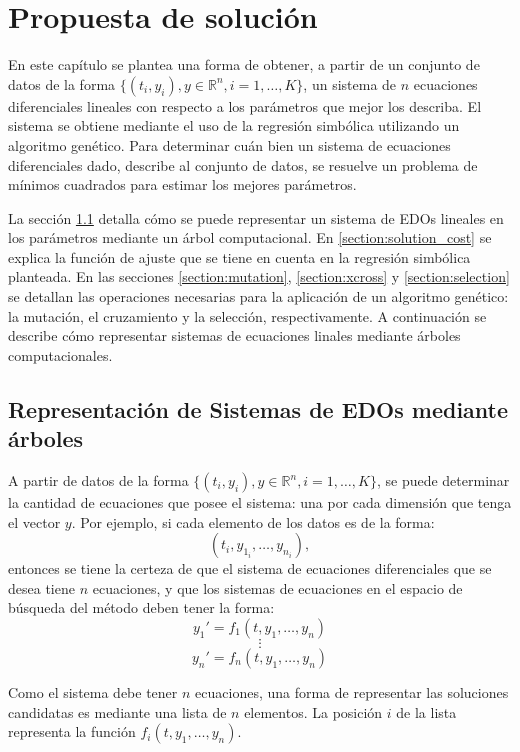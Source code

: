 \chapter{Propuesta de solución}\label{chapter:solution_proposal}

En este capítulo se plantea una forma de obtener, a partir de un conjunto de datos de la forma $\{(t_i, y_i), y \in \mathbb{R}^n, i = 1, \dots, K\}$, un sistema de $n$ ecuaciones diferenciales lineales con respecto a los parámetros que mejor los describa. El sistema se obtiene mediante el uso de la regresión simbólica utilizando un algoritmo genético. Para determinar cuán bien un sistema de ecuaciones diferenciales dado, describe al conjunto de datos, se resuelve un problema de mínimos cuadrados para estimar los mejores parámetros.

La sección \ref{section:solution_representation} detalla cómo se puede representar un sistema de EDOs lineales en los parámetros mediante un árbol computacional. En \ref{section:solution_cost} se explica la función de ajuste que se tiene en cuenta en la regresión simbólica planteada. En las secciones \ref{section:mutation}, \ref{section:xcross} y \ref{section:selection} se detallan las operaciones necesarias para la aplicación de un algoritmo genético: la mutación, el cruzamiento y la selección, respectivamente. A continuación se describe cómo representar sistemas de ecuaciones linales mediante árboles computacionales.


\section{Representación de Sistemas de EDOs mediante árboles}\label{section:solution_representation}

A partir de datos de la forma $\{(t_i, y_i), y \in \mathbb{R}^n, i = 1, \dots, K\}$, se puede determinar la cantidad de ecuaciones que posee el sistema: una por cada dimensión que tenga el vector $y$. Por ejemplo, si cada elemento de los datos es de la forma:
$$(t_i, y_{1_i}, \dots, y_{n_i}),$$
entonces se tiene la certeza de que el sistema de ecuaciones diferenciales que se desea tiene $n$ ecuaciones, y que los sistemas de ecuaciones en el espacio de búsqueda del método deben tener la forma:
$$y_1' = f_1(t, y_1, \dots, y_n)$$
$$\vdots$$
$$y_n' = f_n(t, y_1, \dots, y_n)$$

Como el sistema debe tener $n$ ecuaciones, una forma de representar las soluciones candidatas es mediante una lista de $n$ elementos. La posición $i$ de la lista representa la función $f_i(t,y_1, \dots, y_n)$.

